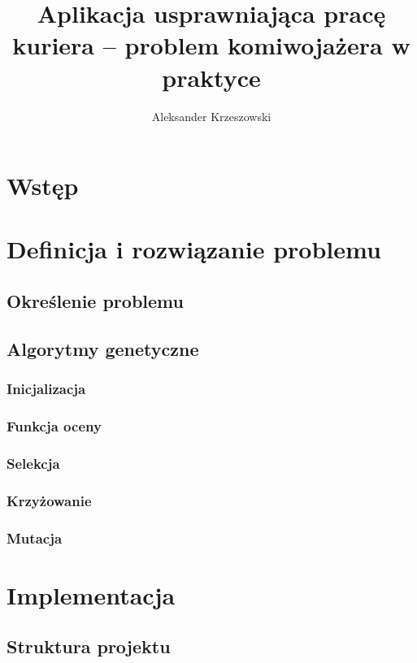\documentclass[12pt,twoside,openright]{report}
\begin{document}
	\author{Aleksander Krzeszowski}
	\title{Aplikacja usprawniająca pracę kuriera -- problem komiwojażera w praktyce}
	
	
	
	\thispagestyle{empty}
	\tableofcontents
	\thispagestyle{empty}
	\clearpage{\pagestyle{empty}\cleardoublepage}
	\chapter*{Wstęp}
		
	\chapter{Definicja i rozwiązanie problemu}
		\label{ch:definicja_i_rozwiazanie}
		\section{Określenie problemu}
			
		\section{Algorytmy genetyczne}
			
		\subsection{Inicjalizacja}
			
		\subsection{Funkcja oceny}
			
		\subsection{Selekcja}
			
		\subsection{Krzyżowanie}
			
		\subsection{Mutacja}
			
	\chapter{Implementacja}
		\section{Struktura projektu}
			
\end{document}
